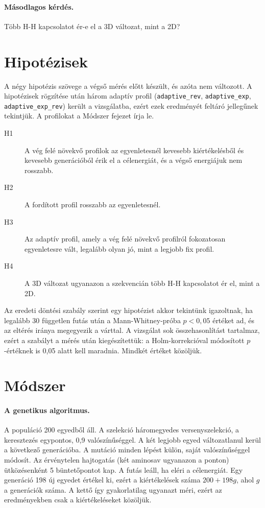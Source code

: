 \documentclass[11pt,a4paper]{article}
\begin{document}
\paragraph{Másodlagos kérdés.} Több H-H kapcsolatot ér-e el a 3D változat, mint
a 2D?

\section{Hipotézisek}

A négy hipotézis szövege a végső mérés előtt készült, és azóta nem változott. A
hipotézisek rögzítése után három adaptív profil (\texttt{adaptive\_rev},
\texttt{adaptive\_exp}, \texttt{adaptive\_exp\_rev}) került a vizsgálatba, ezért
ezek eredményét feltáró jellegűnek tekintjük. A profilokat a Módszer fejezet
írja le.

\begin{description}
\item[H1] A vég felé növekvő profilok az egyenletesnél kevesebb kiértékelésből és
kevesebb generációból érik el a célenergiát, és a végső energiájuk nem rosszabb.
\item[H2] A fordított profil rosszabb az egyenletesnél.
\item[H3] Az adaptív profil, amely a vég felé növekvő profilról fokozatosan
egyenletesre vált, legalább olyan jó, mint a legjobb fix profil.
\item[H4] A 3D változat ugyanazon a szekvencián több H-H kapcsolatot ér el, mint a
2D.
\end{description}

Az eredeti döntési szabály szerint egy hipotézist akkor tekintünk igazoltnak, ha
legalább 30 független futás után a Mann-Whitney-próba $p<0{,}05$ értéket ad, és az
eltérés iránya megegyezik a várttal. A vizsgálat sok összehasonlítást tartalmaz,
ezért a szabályt a mérés után kiegészítettük: a Holm-korrekcióval módosított
$p$-értéknek is 0,05 alatt kell maradnia. Mindkét értéket közöljük.

\section{Módszer}

\paragraph{A genetikus algoritmus.} A populáció 200 egyedből áll. A szelekció
háromegyedes versenyszelekció, a keresztezés egypontos, 0,9 valószínűséggel. A
két legjobb egyed változatlanul kerül a következő generációba. A mutáció minden
lépést külön, saját valószínűséggel módosít. Az érvénytelen hajtogatás (két aminosav ugyanazon a ponton)
ütközésenként 5 büntetőpontot kap. A futás leáll, ha eléri a célenergiát. Egy
generáció 198 új egyedet értékel ki, ezért a kiértékelések száma $200+198g$, ahol
$g$ a generációk száma. A kettő így gyakorlatilag ugyanazt méri, ezért az
eredményekben csak a kiértékeléseket közöljük.
\end{document}
